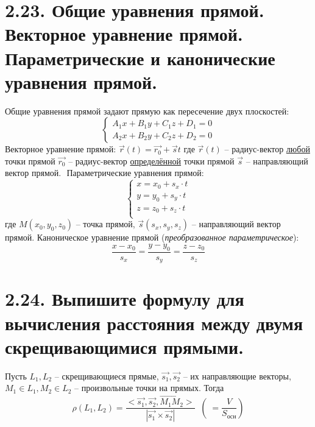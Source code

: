 \documentclass{article}
\begin{document}
\section*{\LARGE 2.23. Общие уравнения прямой. Векторное уравнение прямой. Параметрические и канонические уравнения прямой.  }

Общие уравнения прямой задают прямую как пересечение двух плоскостей:
$$
\begin{cases}
A_1x + B_1y + C_1z + D_1 = 0 \\
A_2x + B_2y + C_2z + D_2 = 0
\end{cases}
$$
Векторное уравнение прямой: $\vec{r}(t) = \vec{r_0} + \vec{s}t$
\newline где $\vec{r}(t)$ -- радиус-вектор \underline{любой} точки прямой
\newline $\vec{r_0}$ -- радиус-вектор \underline{определённой} точки прямой
\newline $\vec{s}$ -- направляющий вектор прямой.
\newline $ $
\newline Параметрические уравнения прямой:
$$
\begin{cases}
x = x_0 + s_x\cdot t \\
y = y_0 + s_y\cdot t \\
z = z_0 + s_z\cdot t \\
\end{cases}
$$
где $M(x_0, y_0, z_0)$ -- точка прямой, $\vec{s}(s_x, s_y, s_z)$ -- направляющий вектор прямой.
\newline Каноническое уравнение прямой (\textit{преобразованное параметрическое}):
$$
\frac{x - x_0}{s_x} = \frac{y - y_0}{s_y} = \frac{z - z_0}{s_z}
$$

\section*{\LARGE 2.24. Выпишите формулу для вычисления расстояния между двумя скрещивающимися прямыми.  }

Пусть $L_1, L_2$ -- скрещивающиеся прямые, $\vec{s_1}, \vec{s_2}$ -- их направляющие векторы, $M_1 \in L_1, M_2 \in L_2$ -- произвольные точки на прямых. Тогда 
$$
\rho(L_1, L_2) = \frac{<\vec{s_1}, \vec{s_2}, \vec{M_1M_2}>}{|\vec{s_1} \times \vec{s_2}|} \;\; (\;= \frac{V}{S_{\mbox{осн}}})
$$
\end{document}
